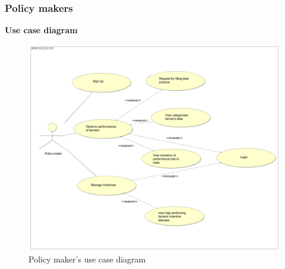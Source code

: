 \subsubsection{Policy makers}
\textbf{\textcolor{myblue}{Use case diagram}}
\begin{figure}[H]
	\centering
    \includegraphics[page=1, width=\textwidth]{Images/ud_policy.JPG}

	\caption{\label{fig:pm_use_case_diagram}Policy maker's use case diagram}

\end{figure}
\label{sect:policy_maker_requirements}



